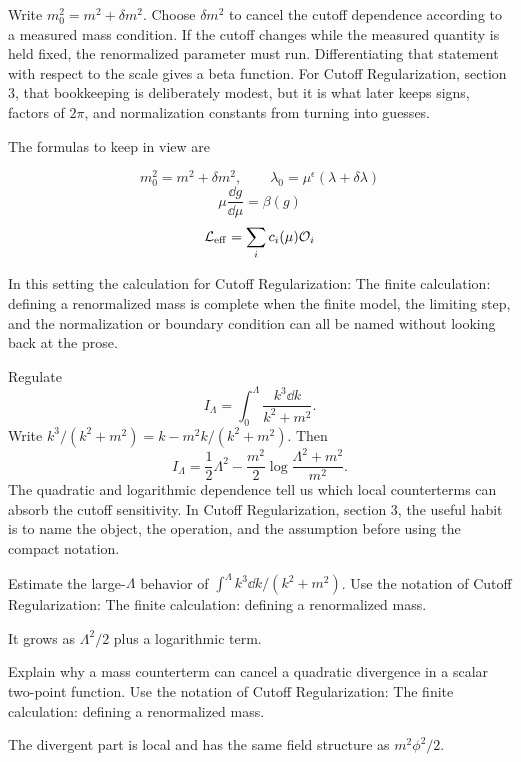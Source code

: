 Write \(m_0^2=m^2+\delta m^2\).  Choose \(\delta m^2\) to cancel the cutoff dependence according to a measured mass condition.  If the cutoff changes while the measured quantity is held fixed, the renormalized parameter must run.  Differentiating that statement with respect to the scale gives a beta function.  For Cutoff Regularization, section 3, that bookkeeping is deliberately modest, but it is what later keeps signs, factors of \(2\pi\), and normalization constants from turning into guesses.

The formulas to keep in view are

\[
  m_0^2=m^2+\delta m^2,\qquad \lambda_0=\mu^\epsilon(\lambda+\delta\lambda)
\]
\[
  \mu\frac{\dd g}{\dd\mu}=\beta(g)
\]
\[
  \mathcal L_{\mathrm{eff}}=\sum_i c_i(\mu)\mathcal O_i
\]

In this setting the calculation for Cutoff Regularization: The finite calculation: defining a renormalized mass is complete when the finite model, the limiting step, and the normalization or boundary condition can all be named without looking back at the prose.




\begin{example}
Regulate
\[
  I_\Lambda=\int_0^\Lambda\frac{k^3\dd k}{k^2+m^2}.
\]
Write \(k^3/(k^2+m^2)=k-m^2k/(k^2+m^2)\).  Then
\[
  I_\Lambda=\frac12\Lambda^2-\frac{m^2}{2}\log\frac{\Lambda^2+m^2}{m^2}.
\]
The quadratic and logarithmic dependence tell us which local counterterms can absorb the cutoff sensitivity.  In Cutoff Regularization, section 3, the useful habit is to name the object, the operation, and the assumption before using the compact notation.
\end{example}



\begin{exercise}
Estimate the large-\(\Lambda\) behavior of \(\int^\Lambda k^3\dd k/(k^2+m^2)\).  Use the notation of Cutoff Regularization: The finite calculation: defining a renormalized mass.
\begin{answer}
It grows as \(\Lambda^2/2\) plus a logarithmic term.
\end{answer}
\end{exercise}

\begin{exercise}
Explain why a mass counterterm can cancel a quadratic divergence in a scalar two-point function.  Use the notation of Cutoff Regularization: The finite calculation: defining a renormalized mass.
\begin{answer}
The divergent part is local and has the same field structure as \(m^2\phi^2/2\).
\end{answer}
\end{exercise}



